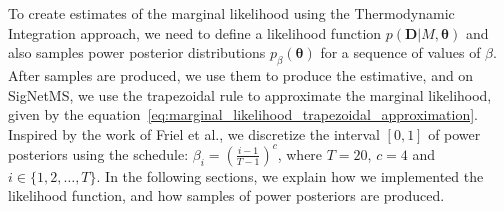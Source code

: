 
To create estimates of the marginal likelihood using the Thermodynamic
Integration approach, we need to define a likelihood function $p({\bm
D}| M, {\bm \theta})$ and also samples power posterior distributions
$p_\beta({\bm \theta})$ for a sequence of values of $\beta$. After
samples are produced, we use them to produce the estimative, and on
SigNetMS, we use the trapezoidal rule to approximate the marginal 
likelihood, given by the 
equation~\ref{eq:marginal_likelihood_trapezoidal_approximation}. 
Inspired by the work of Friel et al., we discretize the interval 
$[0, 1]$ of power posteriors using the schedule: 
$\beta_i = \left(\frac{i - 1}{T - 1}\right)^c$, where $T = 20$, $c = 4$
and $i \in \{1, 2, \ldots, T\}$. In the following sections, we explain
how we implemented the likelihood function, and how samples of power
posteriors are produced.

